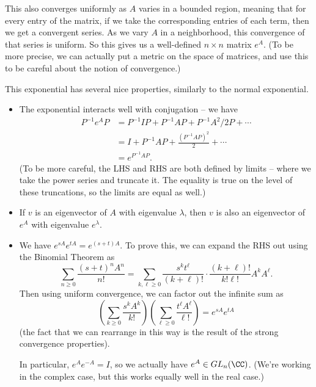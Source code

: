 
This also converges uniformly as $A$ varies in a bounded region, meaning that for every entry of the matrix, if we take the corresponding entries of each term, then we get a convergent series. As we vary $A$ in a neighborhood, this convergence of that series is uniform. So this gives us a well-defined $n \times n$ matrix $e^A$. (To be more precise, we can actually put a metric on the space of matrices, and use this to be careful about the notion of convergence.)

This exponential has several nice properties, similarly to the normal exponential.
\begin{itemize}
    \item The exponential interacts well with conjugation -- we have 
    \begin{align*} P^{-1}e^AP &= P^{-1}IP + P^{-1}AP + P^{-1}A^2/2 P + \cdots \\ 
    &= I + P^{-1}AP + \frac{(P^{-1}AP)^2}{2} + \cdots \\
    &= e^{P^{-1}AP}.\end{align*} (To be more careful, the LHS and RHS are both defined by limits -- where we take the power series and truncate it. The equality is true on the level of these truncations, so the limits are equal as well.)
    
    \item If $v$ is an eigenvector of $A$ with eigenvalue $\lambda$, then $v$ is also an eigenvector of $e^A$ with eigenvalue $e^\lambda$. 
    
    \item We have $e^{sA}e^{tA} = e^{(s + t)A}$. To prove this, we can expand the RHS out using the Binomial Theorem as \[\sum_{n \geq 0} \frac{(s + t)^nA^n}{n!} = \sum_{k, \ell \geq 0} \frac{s^kt^\ell}{(k + \ell)!}\cdot \frac{(k + \ell)!}{k!\ell!}A^kA^\ell.\] Then using uniform convergence, we can factor out the infinite sum as \[\left(\sum_{k\geq 0} \frac{s^kA^k}{k!}\right)\left(\sum_{\ell \geq 0} \frac{t^\ell A^\ell}{\ell!}\right) = e^{sA}e^{tA}\] (the fact that we can rearrange in this way is the result of the strong convergence properties). 
    
    In particular, $e^A e^{-A} = I$, so we actually have $e^A \in GL_n(\CC)$. (We're working in the complex case, but this works equally well in the real case.)
\end{itemize}

